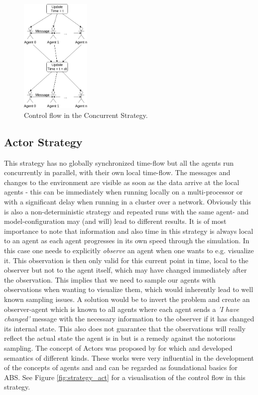 \begin{figure}[H]
	\centering
	\includegraphics[width=0.3\textwidth, angle=0]{./fig/implabs/concurrent.png}
	\caption{Control flow in the Concurrent Strategy.}
	\label{fig:strategy_conc}
\end{figure}

\subsection{Actor Strategy}
This strategy has no globally synchronized time-flow but all the agents run concurrently in parallel, with their own local time-flow. The messages and changes to the environment are visible as soon as the data arrive at the local agents - this can be immediately when running locally on a multi-processor or with a significant delay when running in a cluster over a network. Obviously this is also a non-deterministic strategy and repeated runs with the same agent- and model-configuration may (and will) lead to different results. It is of most importance to note that information and also time in this strategy is always local to an agent as each agent progresses in its own speed through the simulation. In this case one needs to explicitly \textit{observe} an agent when one wants to e.g. visualize it. This observation is then only valid for this current point in time, local to the observer but not to the agent itself, which may have changed immediately after the observation. This implies that we need to sample our agents with observations when wanting to visualize them, which would inherently lead to well known sampling issues. A solution would be to invert the problem and create an observer-agent which is known to all agents where each agent sends a \textit{'I have changed'} message with the necessary information to the observer if it has changed its internal state. This also does not guarantee that the observations will really reflect the actual state the agent is in but is a remedy against the notorious sampling. The concept of Actors was proposed by \cite{hewitt_universal_1973} for which \cite{grief_semantics_1975} and \cite{clinger_foundations_1981} developed semantics of different kinds. These works were very influential in the development of the concepts of agents and and can be regarded as foundational basics for ABS.  See Figure \ref{fig:strategy_act} for a visualisation of the control flow in this strategy.

